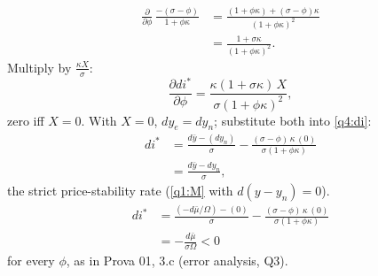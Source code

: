 \begin{sol}
\begin{align}
\end{align}
\begin{align*}
\frac{\partial}{\partial\phi}\,\frac{-(\sigma-\phi)}{1+\phi\kappa}&=\frac{(1+\phi\kappa)+(\sigma-\phi)\kappa}{(1+\phi\kappa)^2}\\
&=\frac{1+\sigma\kappa}{(1+\phi\kappa)^2}.
\end{align*}
Multiply by $\frac{\kappa X}{\sigma}$:
\begin{equation}
\frac{\partial di^*}{\partial\phi}=\frac{\kappa(1+\sigma\kappa)\,X}{\sigma(1+\phi\kappa)^2}, \label{q4:ddi}
\end{equation}
zero iff $X=0$. With $X=0$, $dy_e=dy_n$; substitute both into \eqref{q4:di}:
\begin{align}
di^*&=\frac{d\bar y-(dy_n)}{\sigma}-\frac{(\sigma-\phi)\,\kappa\,(0)}{\sigma(1+\phi\kappa)}\nonumber\\
&=\frac{d\bar y-dy_n}{\sigma}, \nonumber
\end{align}
the strict price-stability rate (\eqref{q1:M} with $d(y-y_n)=0$).
\begin{align}
di^*&=\frac{(-d\bar\mu/\Omega)-(0)}{\sigma}-\frac{(\sigma-\phi)\,\kappa\,(0)}{\sigma(1+\phi\kappa)}\nonumber\\
&=-\frac{d\bar\mu}{\sigma\Omega}<0 \nonumber
\end{align}
for every $\phi$, as in Prova 01, 3.c (error analysis, Q3).
\end{sol}
